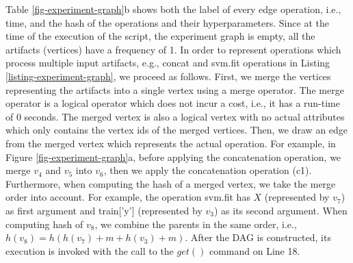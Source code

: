 Table \ref{fig-experiment-graph}b shows both the label of every edge operation, i.e., time, and the hash of the operations and their hyperparameters.
Since at the time of the execution of the script, the experiment graph is empty, all the artifacts (vertices) have a frequency of 1.
In order to represent operations which process multiple input artifacts, e.g., concat and svm.fit operations in Listing \ref{listing-experiment-graph}, we proceed as follows.
First, we merge the vertices representing the artifacts into a single vertex using a merge operator.
The merge operator is a logical operator which does not incur a cost, i.e., it has a run-time of 0 seconds.
The merged vertex is also a logical vertex with no actual attributes which only contains the vertex ids of the merged vertices.
Then, we draw an edge from the merged vertex which represents the actual operation.
For example, in Figure \ref{fig-experiment-graph}a, before applying the concatenation operation, we merge $v_4$ and $v_5$ into $v_6$, then we apply the concatenation operation (c1).
Furthermore, when computing the hash of a merged vertex, we take the merge order into account.
For example, the operation svm.fit has $X$ (represented by $v_7$) as first argument and train['y'] (represented by $v_3$) as its second argument.
When computing hash of $v_8$, we combine the parents in the same order, i.e., $h(v_8) = h(h(v_7) + m + h(v_3) + m)$. 
After the DAG is constructed, its execution is invoked with the call to the $get()$ command on Line 18.

 
%
%
%

